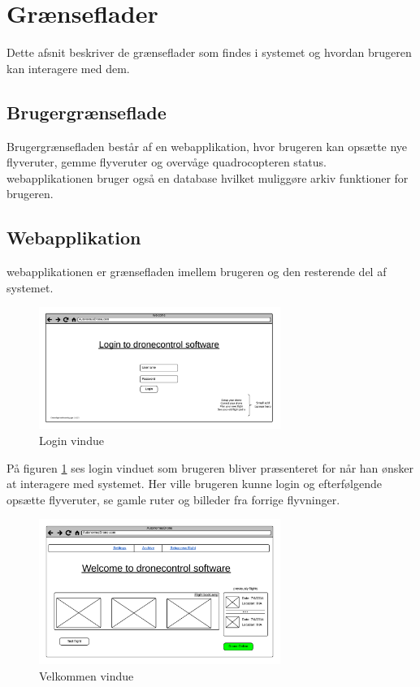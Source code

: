 \section{Grænseflader}
Dette afsnit beskriver de grænseflader som findes i systemet og hvordan brugeren kan interagere med dem.

\subsection{Brugergrænseflade}
Brugergrænsefladen består af en webapplikation, hvor brugeren kan opsætte nye flyveruter, gemme flyveruter og overvåge quadrocopteren status. webapplikationen bruger også en database hvilket muliggøre arkiv funktioner for brugeren. 

\subsection{Webapplikation}
webapplikationen er grænsefladen imellem brugeren og den resterende del af systemet. 

\vspace{-5pt}
\begin{figure}[H]
	\centering
	\includegraphics[width=0.7\textwidth]{Billeder/UI_mockups/login.png}
	\vspace{-5pt}
	\caption{Login vindue}
	\label{fig:mockup_login}
\end{figure}

På figuren \ref{fig:mockup_login} ses login vinduet som brugeren bliver præsenteret for når han ønsker at interagere med systemet. Her ville brugeren kunne login og efterfølgende opsætte flyveruter, se gamle ruter og billeder fra forrige flyvninger. \newpage

\vspace{-5pt}
 \begin{figure}[H]
 	\centering
 	\includegraphics[width=0.7\textwidth]{Billeder/UI_mockups/index.png}
 	\vspace{-5pt}
 	\caption{Velkommen vindue}
 	\label{fig:mockup_welcome}
 \end{figure} 
 

